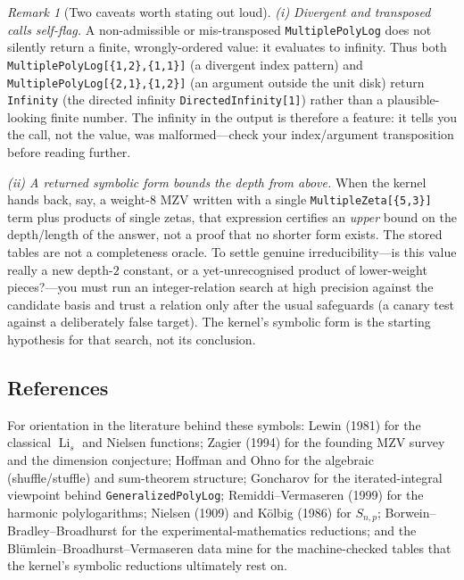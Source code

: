 \documentclass[11pt]{article}
\DeclareMathOperator{\Li}{Li}
\theoremstyle{plain}
\theoremstyle{remark}
\newtheorem{remark}[theorem]{Remark}
\begin{document}
\begin{remark}[Two caveats worth stating out loud]
\emph{(i) Divergent and transposed calls self-flag.} A non-admissible or mis-transposed \texttt{MultiplePolyLog} does not silently return a finite, wrongly-ordered value: it evaluates to infinity. Thus both \texttt{MultiplePolyLog[\{1,2\},\{1,1\}]} (a divergent index pattern) and \texttt{MultiplePolyLog[\{2,1\},\{1,2\}]} (an argument outside the unit disk) return \texttt{Infinity} (the directed infinity \texttt{DirectedInfinity[1]}) rather than a plausible-looking finite number. The infinity in the output is therefore a feature: it tells you the call, not the value, was malformed---check your index/argument transposition before reading further.

\emph{(ii) A returned symbolic form bounds the depth from above.} When the kernel hands back, say, a weight-$8$ MZV written with a single \texttt{MultipleZeta[\{5,3\}]} term plus products of single zetas, that expression certifies an \emph{upper} bound on the depth/length of the answer, not a proof that no shorter form exists. The stored tables are not a completeness oracle. To settle genuine irreducibility---is this value really a new depth-$2$ constant, or a yet-unrecognised product of lower-weight pieces?---you must run an integer-relation search at high precision against the candidate basis and trust a relation only after the usual safeguards (a canary test against a deliberately false target). The kernel's symbolic form is the starting hypothesis for that search, not its conclusion.
\end{remark}

\subsection{References}

For orientation in the literature behind these symbols: Lewin (1981) for the classical $\Li_s$ and Nielsen functions; Zagier (1994) for the founding MZV survey and the dimension conjecture; Hoffman and Ohno for the algebraic (shuffle/stuffle) and sum-theorem structure; Goncharov for the iterated-integral viewpoint behind \texttt{GeneralizedPolyLog}; Remiddi--Vermaseren (1999) for the harmonic polylogarithms; Nielsen (1909) and K\"olbig (1986) for $S_{n,p}$; Borwein--Bradley--Broadhurst for the experimental-mathematics reductions; and the Bl\"umlein--Broadhurst--Vermaseren data mine for the machine-checked tables that the kernel's symbolic reductions ultimately rest on.
\end{document}
